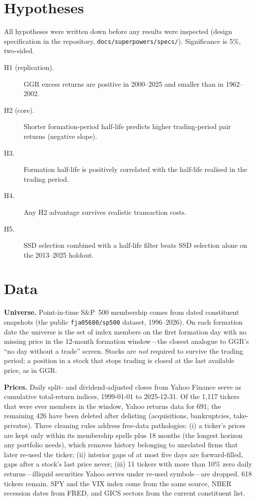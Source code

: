 \documentclass[11pt]{article}
\begin{document}
\section{Hypotheses}

All hypotheses were written down before any results were inspected (design specification in the repository, \texttt{docs/superpowers/specs/}). Significance is 5\%, two-sided.
\begin{description}
\item[H1 (replication).] GGR excess returns are positive in 2000--2025 and smaller than in 1962--2002.
\item[H2 (core).] Shorter formation-period half-life predicts higher trading-period pair returns (negative slope).
\item[H3.] Formation half-life is positively correlated with the half-life realised in the trading period.
\item[H4.] Any H2 advantage survives realistic transaction costs.
\item[H5.] SSD selection combined with a half-life filter beats SSD selection alone on the 2013--2025 holdout.
\end{description}

\section{Data}

\textbf{Universe.} Point-in-time S\&P~500 membership comes from dated constituent snapshots (the public \texttt{fja05680/sp500} dataset, 1996--2026). On each formation date the universe is the set of index members on the first formation day with no missing price in the 12-month formation window---the closest analogue to GGR's ``no day without a trade'' screen. Stocks are \emph{not} required to survive the trading period; a position in a stock that stops trading is closed at the last available price, as in GGR.

\textbf{Prices.} Daily split- and dividend-adjusted closes from Yahoo Finance serve as cumulative total-return indices, 1999-01-01 to 2025-12-31. Of the 1,117 tickers that were ever members in the window, Yahoo returns data for 691; the remaining 426 have been deleted after delisting (acquisitions, bankruptcies, take-privates). Three cleaning rules address free-data pathologies: (i) a ticker's prices are kept only within its membership spells plus 18 months (the longest horizon any portfolio needs), which removes history belonging to unrelated firms that later re-used the ticker; (ii) interior gaps of at most five days are forward-filled, gaps after a stock's last price never; (iii) 11 tickers with more than 10\% zero daily returns---illiquid securities Yahoo serves under re-used symbols---are dropped. 618 tickers remain. SPY and the VIX index come from the same source, NBER recession dates from FRED, and GICS sectors from the current constituent list.
\end{document}
